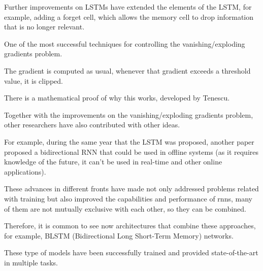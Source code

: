 Further improvements on LSTMs have extended the elements
of the LSTM, for example, adding a forget cell, which
allows the memory cell to drop information that is no
longer relevant.

 One of the most successful techniques for
controlling the vanishing/exploding gradients problem.

The gradient is computed as usual, whenever that gradient
exceeds a threshold value, it is clipped.

There is a mathematical proof of why this works, developed
by Tenescu.

 Together with the improvements on the
vanishing/exploding gradients problem, other researchers
have also contributed with other ideas.

For example, during the same year that the LSTM was
proposed, another paper proposed a bidirectional RNN that
could be used in offline systems (as it requires knowledge
of the future, it can’t be used in real-time and other
online applications).

These advances in different fronts have made not only
addressed problems related with training but also improved
the capabilities and performance of \glspl{rnn}, many of them are
not mutually exclusive with each other, so they can be
combined.

Therefore, it is common to see now architectures that
combine these approaches, for example, BLSTM
(Bidirectional Long Short-Term Memory) networks.

These type of models have been successfully trained and
provided state-of-the-art in multiple tasks.
